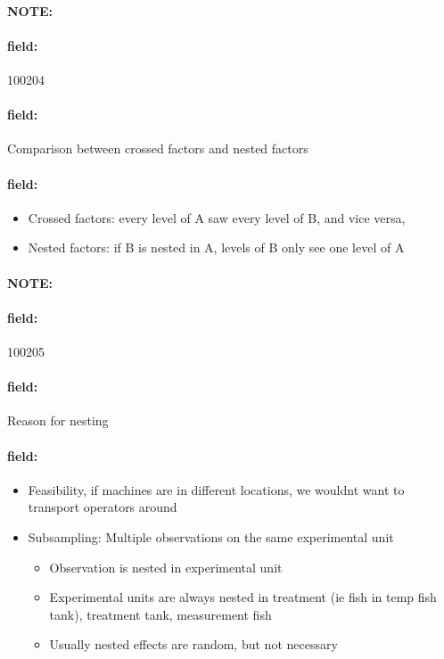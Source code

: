 \documentclass[12pt]{article}
\newenvironment{note}{\paragraph{NOTE:}}{}
\newenvironment{field}{\paragraph{field:}}{}
\begin{document}
\begin{note}
    \begin{field}
        \tiny 100204
    \end{field}
    \begin{field}
        Comparison between crossed factors and nested factors
    \end{field}
    \begin{field}
        \begin{itemize}
          \item Crossed factors: every level of A saw every level of B, and vice versa,
          \item Nested factors: if B is nested in A, levels of B only see one level of A
        \end{itemize}
    \end{field}
\end{note}

\begin{note}
    \begin{field}
        \tiny 100205
    \end{field}
    \begin{field}
        Reason for nesting
    \end{field}
    \begin{field}
        \begin{itemize}
          \item Feasibility, if machines are in different locations, we wouldnt want to transport operators around
          \item Subsampling: Multiple observations on the same experimental unit
          \begin{itemize}
            \item Observation is nested in experimental unit
            \item Experimental units are always nested in treatment (ie fish in temp fish tank), treatment tank, measurement fish
            \item Usually nested effects are random, but not necessary
          \end{itemize}
        \end{itemize}
    \end{field}
\end{note}
\end{document}
